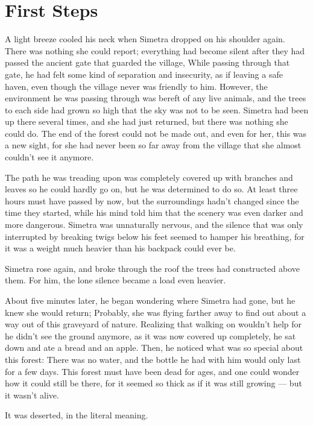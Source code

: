 \chapter{First Steps}
\label{cha:first-steps}
A light breeze cooled his neck when Simetra dropped on his shoulder again. There was nothing she could report; everything had become silent after they had passed the ancient gate that guarded the village, While passing through that gate, he had felt some kind of separation and insecurity, as if leaving a safe haven, even though the village never was friendly to him.
However, the environment he was passing through was bereft of any live animals, and the trees to each side had grown so high that the sky was not to be seen. 
Simetra had been up there several times, and she had just returned, but there was nothing she could do. The end of the forest could not be made out, and even for her, this was a new sight, for she had never been so far away from the village that she almost couldn't see it anymore. 

The path he was treading upon was completely covered up with branches and leaves so he could hardly go on, but he was determined to do so. At least three hours must have passed by now, but the surroundings hadn't changed since the time they started, while his mind told him that the scenery was even darker and more dangerous. Simetra was unnaturally nervous, and the silence that was only interrupted by breaking twigs below his feet seemed to hamper his breathing, for it was a weight much heavier than his backpack could ever be.

Simetra rose again, and broke through the roof the trees had constructed above them. For him, the lone silence became a load even heavier.

About five minutes later, he began wondering where Simetra had gone, but he knew she would return; Probably, she was flying farther away to find out about a way out of this graveyard of nature. Realizing that walking on wouldn't help for he didn't see the ground anymore, as it was now covered up completely, he sat down and ate a bread and an apple. Then, he noticed what was so special about this forest: There was no water, and the bottle he had with him would only last for a few days. This forest must have been dead for ages, and one could wonder how it could still be there, for it seemed so thick as if it was still growing --- but it wasn't alive. 

It was deserted, in the literal meaning. 

